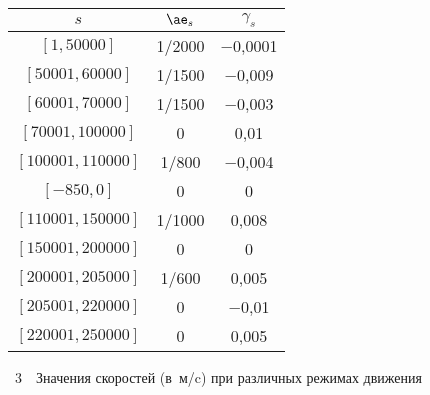 \begin{multicols}{2}
\begin{center}
{\small \tabcolsep=10.2pt
\begin{tabular}{|c|c|c|}
\hline
$s$&$\ae_s$&$\gamma_s$\\
\hline
\hphantom{9999}$[1, 50000]$&1/2000&$-$0,0001\\                      
$[50001, 60000]$&1/1500&$-$0,009\hphantom{9}\\                   
$[60001, 70000]$&1/1500&$-$0,003\hphantom{9}\\                   
\hphantom{9}$[70001, 100000]$&0&0,01\hphantom{\,}\\                           
$[100001, 110000]$&1/800&$-$0,004\hphantom{9}\\                  
$[-850, 0]$\hphantom{$-$99}&0&0\hphantom{999}\\    
 $[110001, 150000]$&1/1000&\hphantom{,}0,008\\
 $[150001, 200000]$&0&0\hphantom{999}\\       
 $[200001, 205000]$&1/600&\hphantom{,}0,005\\
 $[205001, 220000]$&0&$-$0,01\hphantom{99}\\ 
 $[220001, 250000]$&0&\hphantom{,}0,005\\   
 \hline
\end{tabular}
}
\end{center}
\vspace*{-6pt}
\begin{center}

\noindent
\parbox{65mm}{{{\tablename~3}\ \ \small{Значения скоростей (в~м/c) при различных режимах движения
}}
}

\vspace*{3pt}


\end{center}
\end{multicols}
